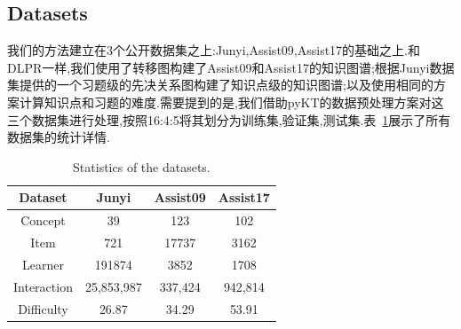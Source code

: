 \documentclass[11pt,a4paper]{article}
\begin{document}
\subsection{Datasets}
我们的方法建立在3个公开数据集之上:Junyi,Assist09,Assist17的基础之上.和DLPR一样,我们使用了转移图构建了Assist09和Assist17的知识图谱;根据Junyi数据集提供的一个习题级的先决关系图构建了知识点级的知识图谱;以及使用相同的方案计算知识点和习题的难度.需要提到的是,我们借助pyKT的数据预处理方案对这三个数据集进行处理,按照16:4:5将其划分为训练集,验证集,测试集.表~\ref{tab:datasets}展示了所有数据集的统计详情.
\begin{table}[H]
\centering
\captionsetup{labelfont=bf,textfont=bf}
\caption{Statistics of the datasets.}
\label{tab:datasets}
\setlength{\tabcolsep}{4pt}
\footnotesize
\begin{tabular}{cccc}
\toprule
\textbf{Dataset} & \textbf{Junyi} & \textbf{Assist09} & \textbf{Assist17}  \\
\midrule
Concept & 39 & 123 & 102 \\
Item & 721 & 17737 & 3162 \\
Learner & 191874 & 3852 & 1708 \\
Interaction & 25,853,987 & 337,424 & 942,814 \\
Difficulty & 26.87 & 34.29 & 53.91 \\
\bottomrule
\end{tabular}
\end{table}
\end{document}
